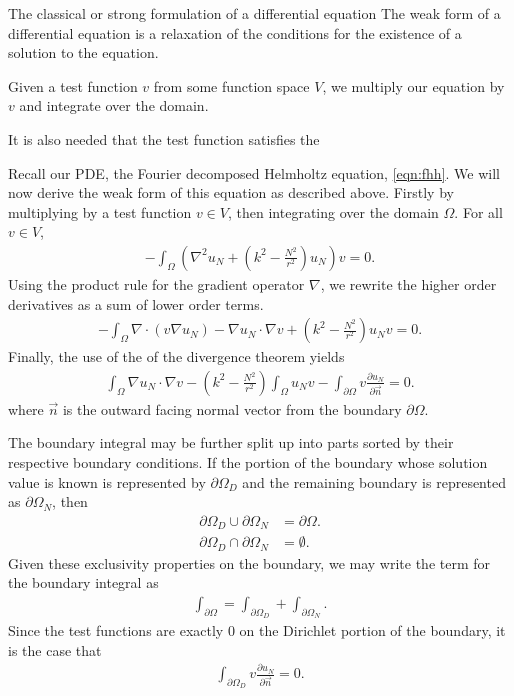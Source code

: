 The classical or strong formulation of a differential equation
The weak form of a differential equation is a relaxation of the conditions for the existence of a solution to the equation.

Given a test function $v$ from some function space $V$, we multiply our equation by $v$ and integrate over the domain.



It is also needed that the test function satisfies the 



Recall our PDE, the Fourier decomposed Helmholtz equation, \eqref{eqn:fhh}.
We will now derive the weak form of this equation as described above. Firstly by multiplying by a test function $v \in V$, then integrating over the domain $\Omega$.
For all $v \in V$,
\begin{align}
	-\int_\Omega \left(\nabla^2 u_N + \left(k^2-\frac{N^2}{r^2}\right)u_N \right) v = 0.
\end{align}
Using the product rule for the gradient operator $\nabla$, we rewrite the higher order derivatives as a sum of lower order terms.
\begin{align}
	-\int_\Omega \nabla \cdot \left( v \nabla u_N \right) - \nabla u_N \cdot \nabla v + \left(k^2-\frac{N^2}{r^2}\right)u_N v = 0.
\end{align}
Finally, the use of the of the divergence theorem yields
\begin{align}
	\int_\Omega \nabla u_N \cdot \nabla v - \left(k^2 - \frac{N^2}{r^2}\right) \int_\Omega u_N v - \int_{\partial\Omega} v \frac{\partial u_N}{\partial \vec{n}} = 0.
\end{align}
where $\vec{n}$ is the outward facing normal vector from the boundary $\partial \Omega$.

The boundary integral may be further split up into parts sorted by their respective boundary conditions.
If the portion of the boundary whose solution value is known is represented by $\partial \Omega_D$ and the remaining boundary is represented as $\partial \Omega_N$, then
\begin{align}
	\partial \Omega_D \cup \partial \Omega_N &= \partial \Omega. \\
	\partial \Omega_D \cap \partial \Omega_N &= \emptyset.
\end{align}
Given these exclusivity properties on the boundary, we may write the term for the boundary integral as
\begin{align}
	\int_{\partial\Omega} = \int_{\partial\Omega_D} + \int_{\partial\Omega_N}.
\end{align}
Since the test functions are exactly 0 on the Dirichlet portion of the boundary, it is the case that
\begin{align}
	\int_{\partial\Omega_D} v \frac{\partial u_N}{\partial \vec{n}} = 0.
\end{align}

